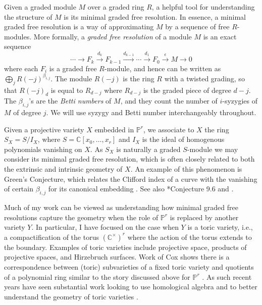 \documentclass[11pt,reqno]{amsart}
\theoremstyle{remark}
\newcommand{\C}{\mathbb{C}}
\renewcommand{\P}{\mathbb{P}}
\begin{document}
Given a graded module $M$ over a graded ring $R$, a helpful tool for understanding the structure of $M$ is its minimal graded free resolution. In essence, a minimal graded free resolution is a way of approximating $M$ by a sequence of free $R$-modules. More formally, a \textit{graded free resolution} of a module $M$ is an exact sequence 
\[
\cdots \xrightarrow{} F_{k} \xrightarrow{d_{k}} F_{k-1} \xrightarrow{d_{k-1}} \cdots \xrightarrow{d_{1}} F_{0}\xrightarrow{\epsilon}M\xrightarrow{} 0
\]
where each $F_{i}$ is a graded free $R$-module, and hence can be written as $\bigoplus_{j}R(-j)^{\beta_{i,j}}$. The module $R(-j)$ is the ring $R$ with a twisted grading, so that $R(-j)_{d}$ is equal to $R_{d-j}$ where $R_{d-j}$ is the graded piece of degree $d-j$. The $\beta_{i,j}$'s are the \textit{Betti numbers} of $M$, and they count the number of $i$-syzygies of $M$ of degree $j$. We will use syzygy and Betti number interchangeably throughout. 

Given a projective variety $X$ embedded in $\P^r$, we associate to $X$ the ring $S_X=S/I_X$, where $S=\C[x_0,\ldots,x_r]$ and $I_X$ is the ideal of homogenous polynomials vanishing on $X$. As $S_X$ is naturally a graded $S$-module we may consider its minimal graded free resolution, which is often closely related to both the extrinsic and intrinsic geometry of $X$.  An example of this phenomenon
 is Green's Conjecture, which relates the Clifford index of a curve with the vanishing of certain $\beta_{i,j}$ for its canonical embedding \cite{voisin02, voisin05, aproduFarkas19}. See also \cite{eisenbud05}*{Conjecture 9.6} and \cite{schreyer86, bayerEisenbud91,farkasPopa05, farkas06,aproduFarkas11,farkasKemeny16,farkasKemeny17}.
 
 Much of my work can be viewed as understanding how minimal graded free resolutions capture the geometry when the role of $\P^{r}$ is replaced by another variety $Y$. In particular, I have focused on the case when $Y$ is a toric variety, i.e., a compactification of the torus $(\C^{\times})^{r}$ where the action of the torus extends to the boundary. Examples of toric varieties include projective space, products of projective spaces, and Hirzebruch surfaces. Work of Cox shows there is a correspondence between (toric) subvarieties of a fixed toric variety and quotients of a polynomial ring similar to the story discussed above for $\P^{r}$ \cite{cox95}. As such recent years have seen substantial work looking to use homological algebra and to better understand the geometry of toric varieties \cite{almousaBruce19,berkeschErmanSmith17,brownErman22,brownErman23,BB21,cartwrightErmanVelscoViray09,EES15,maclaganSmith04,maclaganSmith05}.
\end{document}
